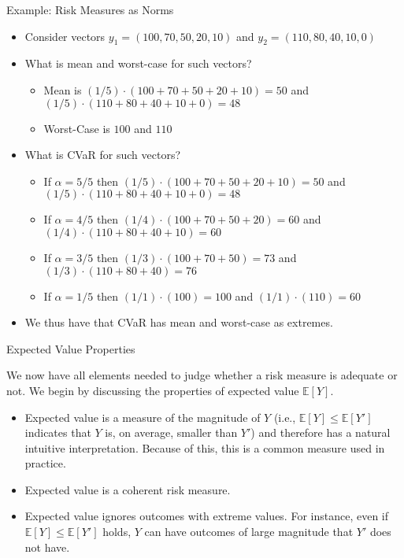 \documentclass[handout,9pt]{beamer}
\begin{document}
%
\begin{frame}{Example: Risk Measures as Norms}

\begin{itemize}
\setlength{\itemsep}{10pt}
\item Consider vectors $y_1=(100,70,50,20,10)$ and $y_2=(110,80,40,10,0)$

\item What is mean and worst-case for such vectors?
\begin{itemize}
\setlength{\itemsep}{10pt}
\item Mean is $(1/5)\cdot (100+70+50+20+10)=50$ and $(1/5)\cdot(110+80+40+10+0)=48$
\item Worst-Case is $100$ and $110$
\end{itemize}
\item What is CVaR for such vectors? 
\begin{itemize}
\setlength{\itemsep}{10pt}
\item If $\alpha=5/5$ then $(1/5)\cdot (100+70+50+20+10)=50$ and $(1/5)\cdot(110+80+40+10+0)=48$
\item If $\alpha=4/5$ then $(1/4)\cdot (100+70+50+20)=60$ and $(1/4)\cdot(110+80+40+10)=60$
\item If $\alpha=3/5$ then $(1/3)\cdot (100+70+50)=73$ and $(1/3)\cdot(110+80+40)=76$
\item If $\alpha=1/5$ then $(1/1)\cdot (100)=100$ and $(1/1)\cdot(110)=60$
\end{itemize}
\item We thus have that CVaR has mean and worst-case as extremes.
\end{itemize}


\end{frame}

%
\begin{frame}{Expected Value Properties}

We now have all elements needed to judge whether a risk measure is adequate or not.  We begin by discussing the properties of expected value $\mathbb{E}[Y]$.

\begin{itemize}
\setlength{\itemsep}{10pt}
\item Expected value is a measure of the magnitude of $Y$ (i.e., $\mathbb{E}[Y]\leq \mathbb{E}[Y']$ indicates that $Y$ is, on average, smaller than $Y'$) and therefore has a natural intuitive interpretation.  Because of this, this is a common measure used in practice. 

\item Expected value is a coherent risk measure.

\item Expected value ignores outcomes with extreme values. For instance, even if $\mathbb{E}[Y]\leq \mathbb{E}[Y']$ holds, $Y$ can have outcomes of large magnitude that $Y'$ does not have. 

\end{itemize}


\end{frame}
\end{document}
